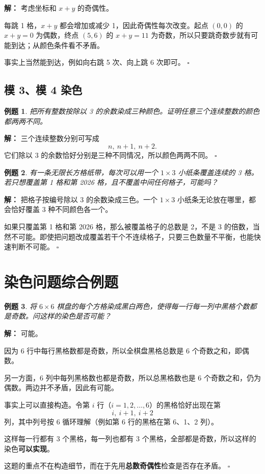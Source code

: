 \documentclass[11pt,a4paper,fontset=fandol]{ctexart}
\theoremstyle{formaltheorem}
\theoremstyle{formalexample}
\newtheorem{example}{例题}[section]
\newenvironment{solution}{\par\noindent\textbf{解：}}{\hfill$\square$\par}
\begin{document}
\begin{solution}
考虑坐标和 $x+y$ 的奇偶性。

每跳 1 格，$x+y$ 都会增加或减少 1，因此奇偶性每次改变。起点 $(0,0)$ 的 $x+y=0$ 为偶数，终点 $(5,6)$ 的 $x+y=11$ 为奇数，所以只要跳奇数步就有可能到达；从颜色条件看不矛盾。

事实上当然能到达，例如向右跳 5 次、向上跳 6 次即可。
\end{solution}

\subsection{模 3、模 4 染色}
\begin{example}
把所有整数按除以 3 的余数染成三种颜色。证明任意三个连续整数的颜色都两两不同。
\end{example}

\begin{solution}
三个连续整数分别可写成
\[
n,\ n+1,\ n+2.
\]
它们除以 3 的余数恰好分别是三种不同情况，所以颜色两两不同。
\end{solution}

\begin{example}
有一条无限长方格纸带，每次可以用一个 $1\times 3$ 小纸条覆盖连续的 3 格。若只想覆盖第 1 格和第 2026 格，且不覆盖中间任何格子，可能吗？
\end{example}

\begin{solution}
把格子按编号除以 3 的余数染成三色。一个 $1\times 3$ 小纸条无论放在哪里，都会恰好覆盖 3 种不同颜色各一个。

如果只覆盖第 1 格和第 2026 格，那么被覆盖格子的总数是 2，不是 3 的倍数，当然不可能。即使把问题改成覆盖若干个不连续格子，只要三色数量不平衡，也能快速判断不可能。
\end{solution}

\section{染色问题综合例题}

\begin{example}
将 $6\times 6$ 棋盘的每个方格染成黑白两色，使得每一行每一列中黑格个数都是奇数。问这样的染色是否可能？
\end{example}

\begin{solution}
可能。

因为 6 行中每行黑格数都是奇数，所以全棋盘黑格总数是 6 个奇数之和，即偶数。

另一方面，6 列中每列黑格数也都是奇数，所以总黑格数也是 6 个奇数之和，仍为偶数。两边并不矛盾，因此有可能。

事实上可以直接构造。令第 $i$ 行（$i=1,2,\ldots,6$）的黑格恰好出现在第
\[
i,\ i+1,\ i+2
\]
列，其中列号按 6 循环理解（例如第 6 行的黑格在第 6、1、2 列）。

这样每一行都有 3 个黑格，每一列也都有 3 个黑格，全部都是奇数，所以这样的染色\textbf{可以实现}。

这题的重点不在构造细节，而在于先用\textbf{总数奇偶性}检查是否存在矛盾。
\end{solution}
\end{document}
